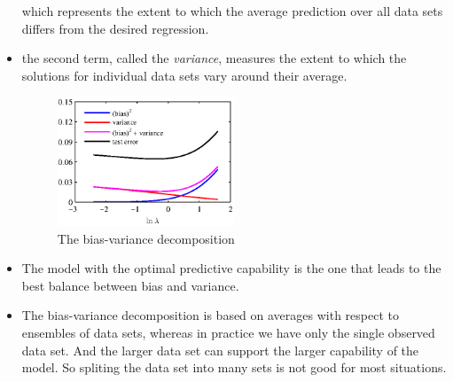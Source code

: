 \documentclass[12pt, a4paper]{article}
\begin{document}
\begin{itemize}
        which represents the extent to which the average prediction over all data sets differs from 
        the desired regression.
        \item the second term, called the \textit{variance}, measures the extent to which the solutions 
        for individual data sets vary around their average.
        \begin{figure}[htbp]
            \centering
            \label{fig:BVD}
            \includegraphics[width=0.5\textwidth]{figures/Figure3_6.eps}
            \caption{The bias-variance decomposition}
        \end{figure}
        \item The model with the optimal predictive capability is the one that leads to the best balance 
        between bias and variance.
        \item The bias-variance decomposition is based on averages with respect to ensembles of data sets, 
        whereas in practice we have only the single observed data set. And the larger data set can support 
        the larger capability of the model. So spliting the data set into many sets is not good for most 
        situations.
    \end{itemize}
\end{document}
